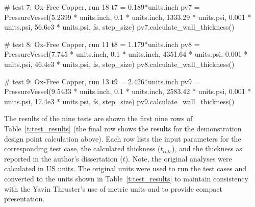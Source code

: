 \documentclass{article}
\begin{document}
\begin{sagesilent}
# test 7: Ox-Free Copper, run 18
t7 = 0.189*units.inch
pv7 = PressureVessel(5.2399 * units.inch,
                     0.1 * units.inch,
                     1333.29 * units.psi,
                     0.001 * units.psi,
                     56.6e3 * units.psi,
                     fs,
                     step_size)
pv7.calculate_wall_thickness()

# test 8: Ox-Free Copper, run 11
t8 = 1.179*units.inch
pv8 = PressureVessel(7.745 * units.inch,
                     0.1 * units.inch,
                     4351.64 * units.psi,
                     0.001 * units.psi,
                     46.4e3 * units.psi,
                     fs,
                     step_size)
pv8.calculate_wall_thickness()

# test 9: Ox-Free Copper, run 13
t9 = 2.426*units.inch
pv9 = PressureVessel(9.5433 * units.inch,
                     0.1 * units.inch,
                     2583.42 * units.psi,
                     0.001 * units.psi,
                     17.4e3 * units.psi,
                     fs,
                     step_size)
pv9.calculate_wall_thickness()
\end{sagesilent}

The results of the nine tests are shown the first nine rows of Table~\ref{t:test_results} (the final row shows the results for the demonstration design point calculation above).  Each row lists the input parameters for the corresponding test case, the calculated thickness ($t_{calc}$), and the thickness as reported in the author's dissertation ($t$).  Note, the original analyses were calculated in US units.  The original units were used to run the test cases and converted to the units shown in Table~\ref{t:test_results}  to maintain consistency with the Yavin Thruster's use of metric units and to provide compact presentation.  

\clearpage
\end{document}
